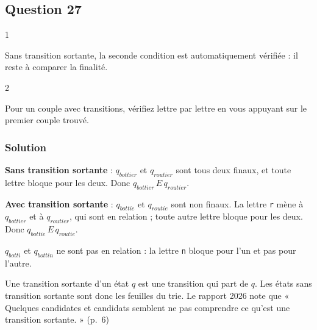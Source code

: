 \documentclass[11pt,a4paper]{article}
\begin{document}
\hypertarget{question-27}{%
\subsection{Question 27}\label{question-27}}

\begin{indication}{1}

Sans transition sortante, la seconde condition est automatiquement vérifiée : il reste à comparer la finalité.

\end{indication}

\begin{indication}{2}

Pour un couple avec transitions, vérifiez lettre par lettre en vous appuyant sur le premier couple trouvé.

\end{indication}

\hypertarget{solution-26}{%
\subsubsection{Solution}\label{solution-26}}

\textbf{Sans transition sortante} : \(q_{bottier}\) et \(q_{routier}\) sont tous deux finaux, et toute lettre bloque pour les deux. Donc \(q_{bottier}\,E\,q_{routier}\).

\textbf{Avec transition sortante} : \(q_{bottie}\) et \(q_{routie}\) sont non finaux. La lettre \texttt{r} mène à \(q_{bottier}\) et à \(q_{routier}\), qui sont en relation ; toute autre lettre bloque pour les deux. Donc \(q_{bottie}\,E\,q_{routie}\).

\begin{piege}

\(q_{botti}\) et \(q_{bottin}\) ne sont pas en relation : la lettre \texttt{n} bloque pour l'un et pas pour l'autre.

\end{piege}

\begin{piege}

Une transition sortante d'un état \(q\) est une transition qui part de \(q\). Les états sans transition sortante sont donc les feuilles du trie. Le rapport 2026 note que « Quelques candidates et candidats semblent ne pas comprendre ce qu'est une transition sortante. » (p.~6)

\end{piege}
\end{document}
